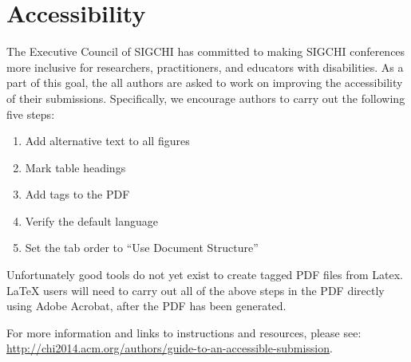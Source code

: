 \section{Accessibility}
                                The Executive Council of SIGCHI has committed to making SIGCHI conferences more inclusive for researchers, practitioners, and educators with disabilities. As a part of this goal, the all authors are asked to work on improving the accessibility of their submissions. Specifically, we encourage authors to carry out the following five steps:

\begin{enumerate}
                                	\item Add alternative text to all figures
                                	\item Mark table headings
                                	\item Add tags to the PDF
                                	\item Verify the default language
                                	\item Set the tab order to ``Use Document Structure''
                                \end{enumerate}
                                Unfortunately good tools do not yet exist to create tagged PDF files from Latex. LaTeX users will need to carry out all of the above steps in the PDF directly using Adobe Acrobat, after the PDF has been generated.

For more information and links to instructions and resources, please see:
                                {\url{http://chi2014.acm.org/authors/guide-to-an-accessible-submission}}.